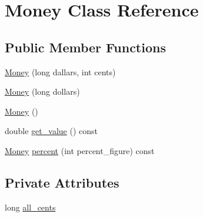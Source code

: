 \hypertarget{classMoney}{}\section{Money Class Reference}
\label{classMoney}
\subsection*{Public Member Functions}
\begin{DoxyCompactItemize}
\item 
\hyperlink{classMoney_aa68a869972c3f4c70c76a09f6063e9ce}{Money} (long dallars, int cents)
\item 
\hyperlink{classMoney_a096f367d27585ed24a9251a10c524dc5}{Money} (long dollars)
\item 
\hyperlink{classMoney_a883c32ea0f71c9d1422141c384d225ba}{Money} ()
\item 
double \hyperlink{classMoney_acee1d7ddca28c78740229a57cda5874f}{get\+\_\+value} () const 
\item 
\hyperlink{classMoney}{Money} \hyperlink{classMoney_ac8a69a07c01ce78261155d8262c4d132}{percent} (int percent\+\_\+figure) const 
\end{DoxyCompactItemize}
\subsection*{Private Attributes}
\begin{DoxyCompactItemize}
\item 
long \hyperlink{classMoney_a499d11509460668b7c262d9a58f7f310}{all\+\_\+cents}
\end{DoxyCompactItemize}
